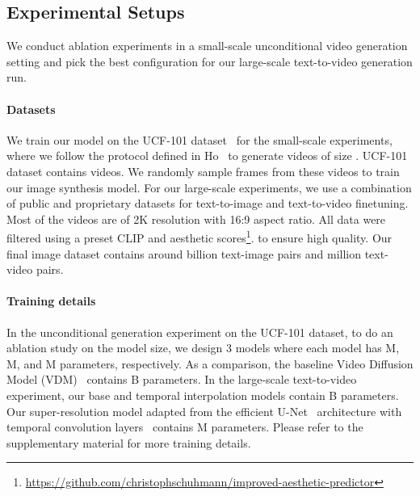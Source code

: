 \documentclass[10pt,twocolumn,letterpaper]{article}
\newcommand{\new}[1]{#1}
\begin{document}
\subsection{Experimental Setups}
We conduct ablation experiments in a small-scale unconditional video generation setting and pick the best configuration for our large-scale text-to-video generation run.


\paragraph{Datasets} We train our model on the UCF-101 dataset~\cite{soomro2012ucf101} for the small-scale experiments, where we follow the protocol defined in Ho~\etal\cite{ho2022video} to generate videos of size . 
\new{UCF-101 dataset contains  videos. We randomly sample frames from these videos to train our image synthesis model. For our large-scale experiments, we use a combination of public and proprietary datasets for text-to-image and text-to-video finetuning. Most of the videos are of 2K resolution with 16:9 aspect ratio.} All data were filtered using a preset CLIP and aesthetic scores\footnote{\footnotesize \url{https://github.com/christophschuhmann/improved-aesthetic-predictor}}. to ensure high quality. 
Our final image dataset contains around  billion text-image pairs and  million text-video pairs.


\paragraph{Training details} 
In the unconditional generation experiment on the UCF-101 dataset, to do an ablation study on the model size, we design 3 models where each model has M, M, and M parameters, respectively. As a comparison, 
the baseline Video Diffusion Model (VDM)~\cite{ho2022video} contains B parameters. In the large-scale text-to-video experiment, our base and temporal interpolation models contain B parameters. Our super-resolution model adapted from the efficient U-Net~\cite{saharia2022photorealistic} architecture with temporal convolution layers~\cite{ho2022imagen,singer2022make} contains M parameters. Please refer to the supplementary material for more training details.
\end{document}
